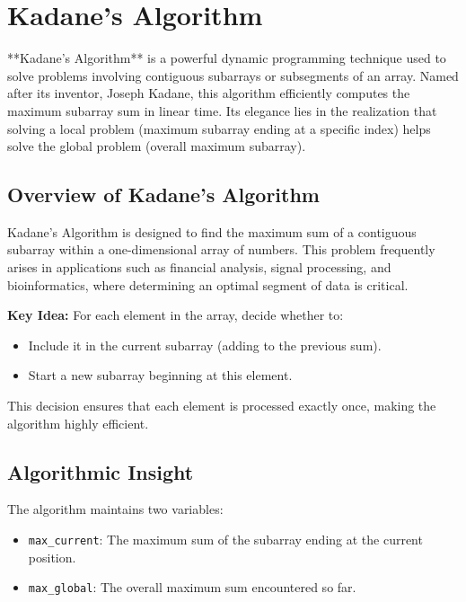 \section{Kadane's Algorithm}
\label{sec:Kadane_Algorithm}

**Kadane's Algorithm** is a powerful dynamic programming technique used to solve problems involving contiguous subarrays or subsegments of an array. Named after its inventor, Joseph Kadane, this algorithm efficiently computes the maximum subarray sum in linear time. Its elegance lies in the realization that solving a local problem (maximum subarray ending at a specific index) helps solve the global problem (overall maximum subarray).

\subsection*{Overview of Kadane's Algorithm}
Kadane's Algorithm is designed to find the maximum sum of a contiguous subarray within a one-dimensional array of numbers. This problem frequently arises in applications such as financial analysis, signal processing, and bioinformatics, where determining an optimal segment of data is critical.

\textbf{Key Idea:}  
For each element in the array, decide whether to:
\begin{itemize}
    \item Include it in the current subarray (adding to the previous sum).
    \item Start a new subarray beginning at this element.
\end{itemize}

This decision ensures that each element is processed exactly once, making the algorithm highly efficient.

\subsection*{Algorithmic Insight}
The algorithm maintains two variables:
\begin{itemize}
    \item \texttt{max\_current}: The maximum sum of the subarray ending at the current position.
    \item \texttt{max\_global}: The overall maximum sum encountered so far.
\end{itemize}

